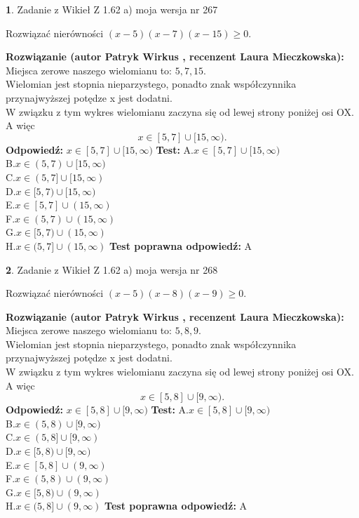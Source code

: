 \documentclass[12pt, a4paper]{article}
\theoremstyle{definition} %
\newtheorem{zad}{}
\newcommand{\zadStart}[1]{\begin{zad}#1\newline}
\newcommand{\zadStop}{\end{zad}}
\newcommand{\rozwStart}[2]{\noindent \textbf{Rozwiązanie (autor #1 , recenzent #2): }\newline}
\newcommand{\rozwStop}{\newline}
\newcommand{\odpStart}{\noindent \textbf{Odpowiedź:}\newline}
\newcommand{\odpStop}{\newline}
\newcommand{\testStart}{\noindent \textbf{Test:}\newline}
\newcommand{\testStop}{\newline}
\newcommand{\kluczStart}{\noindent \textbf{Test poprawna odpowiedź:}\newline}
\newcommand{\kluczStop}{\newline}
\begin{document}
\zadStart{Zadanie z Wikieł Z 1.62 a) moja wersja nr 267}

Rozwiązać nierówności $(x-5)(x-7)(x-15)\ge0$.
\zadStop
\rozwStart{Patryk Wirkus}{Laura Mieczkowska}
Miejsca zerowe naszego wielomianu to: $5, 7, 15$.\\
Wielomian jest stopnia nieparzystego, ponadto znak współczynnika przy\linebreak najwyższej potędze x jest dodatni.\\ W związku z tym wykres wielomianu zaczyna się od lewej strony poniżej osi OX. A więc $$x \in [5,7] \cup [15,\infty).$$
\rozwStop
\odpStart
$x \in [5,7] \cup [15,\infty)$
\odpStop
\testStart
A.$x \in [5,7] \cup [15,\infty)$\\
B.$x \in (5,7) \cup [15,\infty)$\\
C.$x \in (5,7] \cup [15,\infty)$\\
D.$x \in [5,7) \cup [15,\infty)$\\
E.$x \in [5,7] \cup (15,\infty)$\\
F.$x \in (5,7) \cup (15,\infty)$\\
G.$x \in [5,7) \cup (15,\infty)$\\
H.$x \in (5,7] \cup (15,\infty)$
\testStop
\kluczStart
A
\kluczStop



\zadStart{Zadanie z Wikieł Z 1.62 a) moja wersja nr 268}

Rozwiązać nierówności $(x-5)(x-8)(x-9)\ge0$.
\zadStop
\rozwStart{Patryk Wirkus}{Laura Mieczkowska}
Miejsca zerowe naszego wielomianu to: $5, 8, 9$.\\
Wielomian jest stopnia nieparzystego, ponadto znak współczynnika przy\linebreak najwyższej potędze x jest dodatni.\\ W związku z tym wykres wielomianu zaczyna się od lewej strony poniżej osi OX. A więc $$x \in [5,8] \cup [9,\infty).$$
\rozwStop
\odpStart
$x \in [5,8] \cup [9,\infty)$
\odpStop
\testStart
A.$x \in [5,8] \cup [9,\infty)$\\
B.$x \in (5,8) \cup [9,\infty)$\\
C.$x \in (5,8] \cup [9,\infty)$\\
D.$x \in [5,8) \cup [9,\infty)$\\
E.$x \in [5,8] \cup (9,\infty)$\\
F.$x \in (5,8) \cup (9,\infty)$\\
G.$x \in [5,8) \cup (9,\infty)$\\
H.$x \in (5,8] \cup (9,\infty)$
\testStop
\kluczStart
A
\kluczStop
\end{document}
